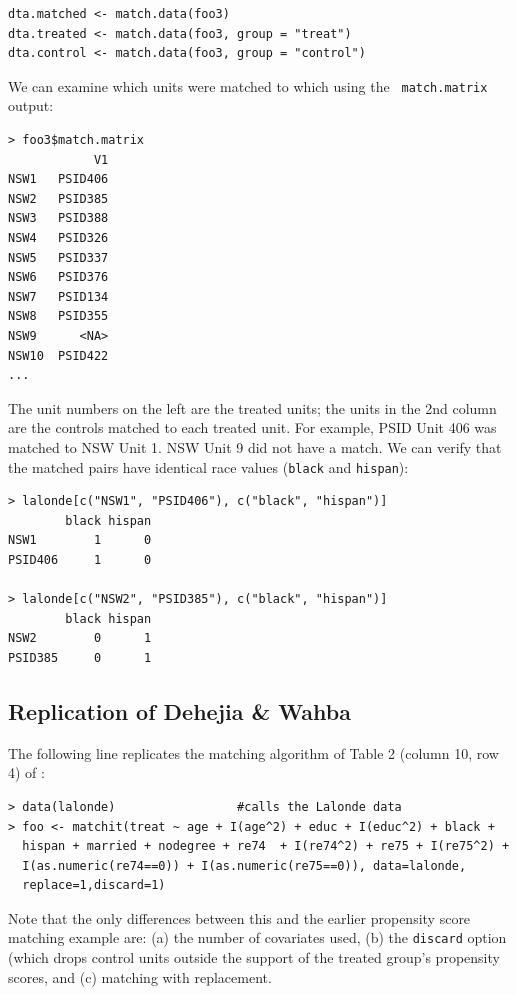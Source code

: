 \documentclass[oneside,letterpaper,titlepage]{article}
\begin{document}
\begin{verbatim}
dta.matched <- match.data(foo3)
dta.treated <- match.data(foo3, group = "treat")
dta.control <- match.data(foo3, group = "control")
\end{verbatim}

We can examine which units were matched to which using the {\tt
  match.matrix} output:
\begin{verbatim}
> foo3$match.matrix
            V1
NSW1   PSID406
NSW2   PSID385
NSW3   PSID388
NSW4   PSID326
NSW5   PSID337
NSW6   PSID376
NSW7   PSID134
NSW8   PSID355
NSW9      <NA>
NSW10  PSID422
...  
\end{verbatim}  %

The unit numbers on the left are the treated units; the units in the
2nd column are the controls matched to each treated unit.  For
example, PSID Unit 406 was matched to NSW Unit 1.  NSW Unit 9 did not
have a match.  We can verify that the matched pairs have identical race values 
(\texttt{black} and \texttt{hispan}):

\begin{verbatim}
> lalonde[c("NSW1", "PSID406"), c("black", "hispan")]
        black hispan
NSW1        1      0
PSID406     1      0

> lalonde[c("NSW2", "PSID385"), c("black", "hispan")]
        black hispan
NSW2        0      1
PSID385     0      1
\end{verbatim}


\subsection{Replication of Dehejia \& Wahba}

The following line replicates the matching algorithm of Table 2
(column 10, row 4) of \citet{DehWah99}:

\begin{verbatim}
> data(lalonde)                 #calls the Lalonde data
> foo <- matchit(treat ~ age + I(age^2) + educ + I(educ^2) + black +
  hispan + married + nodegree + re74  + I(re74^2) + re75 + I(re75^2) +
  I(as.numeric(re74==0)) + I(as.numeric(re75==0)), data=lalonde,
  replace=1,discard=1)
\end{verbatim}

Note that the only differences between this and the earlier propensity
score matching example are: (a) the number of covariates used, (b) the
\texttt{discard} option (which drops control units outside the support
of the treated group's propensity scores, and (c) matching with
replacement.
\end{document}
